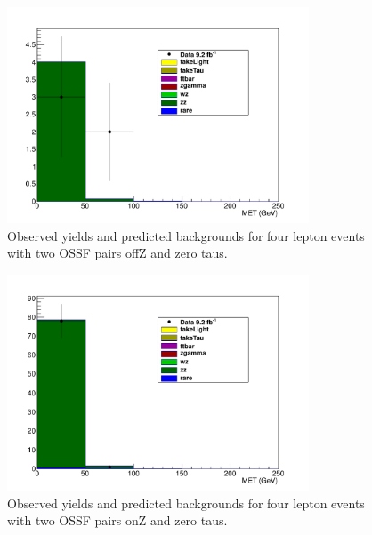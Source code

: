 \begin{figure}[htp]
\begin{center}
\includegraphics[width=0.8\textwidth]{plots/4L_MET_dist_offZ_ossf2_tau0_note.pdf}
\caption{Observed yields and predicted backgrounds for four lepton events with two OSSF pairs offZ and zero taus.}
\label{fig:L4OSSF2offZtau0}
\end{center}
\end{figure}
\begin{figure}[htp]
\begin{center}
\includegraphics[width=0.8\textwidth]{plots/4L_MET_dist_onZ_ossf2_tau0_note.pdf}
\caption{Observed yields and predicted backgrounds for four lepton events with two OSSF pairs onZ and zero taus.}
\label{fig:L4OSSF2onZtau0}
\end{center}
\end{figure}
